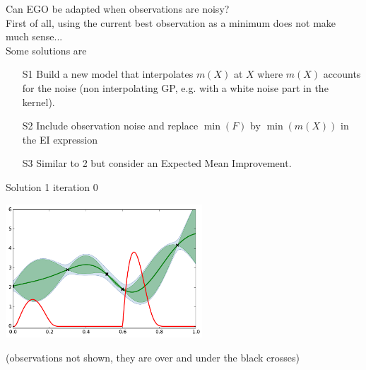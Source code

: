 
\begin{frame}{}
Can EGO be adapted when observations are noisy?\\
\vspace{5mm}
First of all, using the current best observation as a minimum does not make much sense...\\
\vspace{5mm}
Some solutions are
\begin{itemize}
	\item[S1] Build a new model that interpolates $m(X)$ at $X$ where $m(X)$ accounts for the noise (non interpolating GP, e.g. with a white noise part in the kernel).
	\item[S2] Include observation noise and replace $\min(F)$ by $\min(m(X))$ in the EI expression
	\item[S3] Similar to 2 but consider an Expected Mean Improvement.
\end{itemize}
\end{frame}

\begin{frame}{Solution 1}
iteration 0
\begin{center}
\includegraphics[height=5cm]{4_optimization/figures/python/ego_EI1n0}
\end{center}
\tiny (observations not shown, they are over and under the black crosses)\\
\end{frame}

